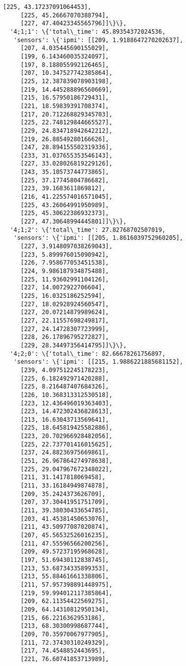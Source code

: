 \documentclass[11pt]{article}
\begin{document}
\begin{tcolorbox}[breakable, size=fbox, boxrule=.5pt, pad at break*=1mm, opacityfill=0]
\begin{Verbatim}[commandchars=\\\{\}]
     [225, 43.17237091064453],
     [225, 45.26667070388794],
     [227, 47.40423345565796]]\}\},
  '4;1;1': \{'total\_time': 45.89354372024536,
   'sensors': \{'ipmi': [[209, 1.9188647270202637],
     [207, 4.035445690155029],
     [199, 6.143460035324097],
     [197, 8.188055992126465],
     [207, 10.347527742385864],
     [225, 12.387839078903198],
     [219, 14.445288896560669],
     [215, 16.57950186729431],
     [221, 18.59839391708374],
     [217, 20.712268829345703],
     [225, 22.748129844665527],
     [229, 24.834718942642212],
     [219, 26.88549280166626],
     [247, 28.894155502319336],
     [233, 31.037655353546143],
     [227, 33.028026819229126],
     [243, 35.10573744773865],
     [225, 37.17745804786682],
     [223, 39.1683611869812],
     [216, 41.225574016571045],
     [225, 43.26064991950989],
     [225, 45.30622386932373],
     [227, 47.30648994445801]]\}\},
  '4;1;2': \{'total\_time': 27.82768702507019,
   'sensors': \{'ipmi': [[205, 1.8616039752960205],
     [227, 3.9148097038269043],
     [223, 5.899976015090942],
     [226, 7.958677053451538],
     [224, 9.986187934875488],
     [225, 11.93602991104126],
     [227, 14.0072922706604],
     [225, 16.0325186252594],
     [227, 18.02928924560547],
     [227, 20.07214879989624],
     [227, 22.11557698249817],
     [227, 24.14728307723999],
     [228, 26.17896795272827],
     [229, 28.34497356414795]]\}\},
  '4;2;0': \{'total\_time': 82.66678261756897,
   'sensors': \{'ipmi': [[215, 1.9886221885681152],
     [239, 4.097512245178223],
     [225, 6.182492971420288],
     [225, 8.216487407684326],
     [226, 10.368313312530518],
     [223, 12.436496019363403],
     [223, 14.472302436828613],
     [213, 16.63043713569641],
     [225, 18.645819425582886],
     [223, 20.702966928482056],
     [225, 22.737701416015625],
     [237, 24.88236975669861],
     [251, 26.967864274978638],
     [225, 29.047967672348022],
     [211, 31.1417818069458],
     [211, 33.16184949874878],
     [209, 35.2424373626709],
     [207, 37.30441951751709],
     [211, 39.38030433654785],
     [203, 41.45381450653076],
     [211, 43.50977087020874],
     [207, 45.56532526016235],
     [211, 47.55596566200256],
     [209, 49.57237195968628],
     [197, 51.69430112838745],
     [213, 53.68734335899353],
     [213, 55.88461661338806],
     [211, 57.957398891448975],
     [219, 59.994012117385864],
     [209, 62.11354422569275],
     [209, 64.14310812950134],
     [215, 66.2216362953186],
     [213, 68.30300998687744],
     [209, 70.35970067977905],
     [211, 72.37430310249329],
     [217, 74.4548852443695],
     [221, 76.60741853713989],

\end{Verbatim}
\end{tcolorbox}
\end{document}
